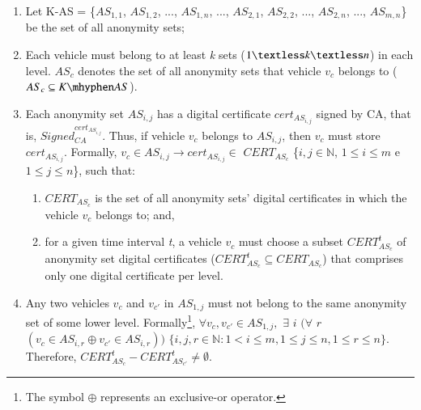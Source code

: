 \documentclass[preprint,12pt]{elsarticle}
\begin{document}
\begin{enumerate}
	\item Let K-AS = \{$AS_{1,1}$, $AS_{1,2}$, ..., $AS_{1,n}$, ...,  $AS_{2,1}$, $AS_{2,2}$, ..., $AS_{2,n}$, ..., $AS_{m,n}$\} be the set of all anonymity sets;
	
	\item Each vehicle must belong to at least \textit{k} sets ($1 \textless k \textless n$) in each level. $AS_{c}$ denotes the set of all anonymity sets that vehicle $v_{c}$ belongs to ($AS_{c} \subseteq K \mhyphen AS$).
	
	
\item Each anonymity set $AS_{i,j}$ has a digital certificate $cert_{AS_{i,j}}$ signed by CA, that is, $Signed^{cert_{AS_{i,j}}}_{CA}$. Thus, if vehicle $v_{c}$ belongs to $AS_{i,j}$, then $v_{c}$ must store $cert_{AS_{i,j}}$. Formally, $v_{c} \in AS_{i,j} \rightarrow cert_{AS_{i,j}} \in$ $CERT_{AS_{c}}$ \{$i, j \in \mathbb{N}$, $1 \le i \le m$ e $1 \le j \le n$\}, such that:
	
	\begin{enumerate}
		\item $CERT_{AS_{c}}$ is the set of all anonymity sets' digital certificates in which the vehicle $v_{c}$ belongs to; and,
	
		\item for a given time interval \textit{t}, a vehicle $v_{c}$ must choose a subset $CERT^{t}_{AS_{c}}$ of anonymity set digital certificates ($CERT^{t}_{AS_{c}} \subseteq CERT_{AS_{c}}$) that comprises only one digital certificate per level.
	\end{enumerate}
	
	\item Any two vehicles $v_{c}$ and $v_{c'}$ in $AS_{1,j}$ must not belong to the same anonymity set of some lower level. Formally\footnote{The symbol $\oplus$ represents an exclusive-or operator.}, $\forall v_{c}, v_{c'} \in AS_{1, j},$  $\exists$ $i$ $(\forall$ $r$ $(v_{c} \in AS_{i,r} \oplus v_{c'} \in AS_{i,r} )) $ $ \{i, j, r \in \mathbb{N} : 1 < i \le m, 1 \le j \le n, 1 \le r \le n\}$. Therefore, $CERT^{t}_{AS_{c}} - CERT^{t}_{AS_{c'}} \neq \emptyset$.
\end{enumerate}
\end{document}
